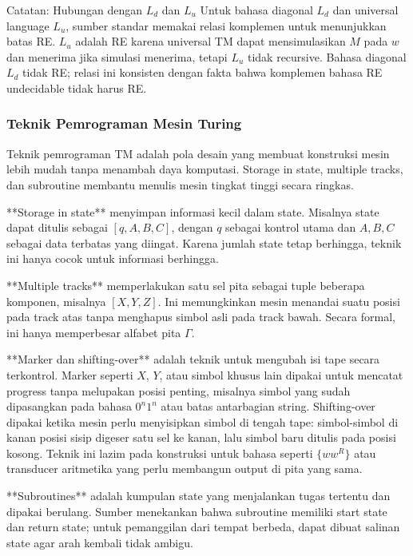 \begin{cmt}{Catatan: Hubungan dengan $L_d$ dan $L_u$}{}
Untuk bahasa diagonal $L_d$ dan universal language $L_u$, sumber standar memakai relasi komplemen untuk menunjukkan batas RE. $L_u$ adalah RE karena universal TM dapat mensimulasikan $M$ pada $w$ dan menerima jika simulasi menerima, tetapi $L_u$ tidak recursive. Bahasa diagonal $L_d$ tidak RE; relasi ini konsisten dengan fakta bahwa komplemen bahasa RE undecidable tidak harus RE.
\end{cmt}

\subsubsection{Teknik Pemrograman Mesin Turing}

\begin{jawab}
Teknik pemrograman TM adalah pola desain yang membuat konstruksi mesin lebih mudah tanpa menambah daya komputasi. Storage in state, multiple tracks, dan subroutine membantu menulis mesin tingkat tinggi secara ringkas.
\end{jawab}

**Storage in state** menyimpan informasi kecil dalam state. Misalnya state dapat ditulis sebagai $[q,A,B,C]$, dengan $q$ sebagai kontrol utama dan $A,B,C$ sebagai data terbatas yang diingat. Karena jumlah state tetap berhingga, teknik ini hanya cocok untuk informasi berhingga.

**Multiple tracks** memperlakukan satu sel pita sebagai tuple beberapa komponen, misalnya $[X,Y,Z]$. Ini memungkinkan mesin menandai suatu posisi pada track atas tanpa menghapus simbol asli pada track bawah. Secara formal, ini hanya memperbesar alfabet pita $\Gamma$.

**Marker dan shifting-over** adalah teknik untuk mengubah isi tape secara terkontrol. Marker seperti $X$, $Y$, atau simbol khusus lain dipakai untuk mencatat progress tanpa melupakan posisi penting, misalnya simbol yang sudah dipasangkan pada bahasa $0^n1^n$ atau batas antarbagian string. Shifting-over dipakai ketika mesin perlu menyisipkan simbol di tengah tape: simbol-simbol di kanan posisi sisip digeser satu sel ke kanan, lalu simbol baru ditulis pada posisi kosong. Teknik ini lazim pada konstruksi untuk bahasa seperti $\{ww^R\}$ atau transducer aritmetika yang perlu membangun output di pita yang sama.

**Subroutines** adalah kumpulan state yang menjalankan tugas tertentu dan dipakai berulang. Sumber menekankan bahwa subroutine memiliki start state dan return state; untuk pemanggilan dari tempat berbeda, dapat dibuat salinan state agar arah kembali tidak ambigu.

